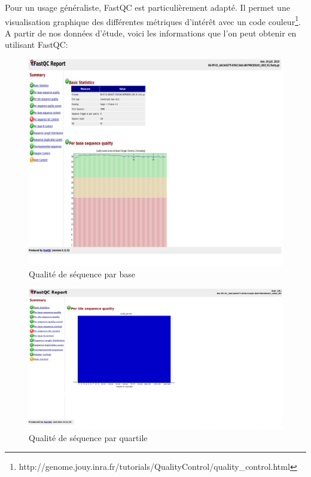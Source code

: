 \documentclass[a4paper,11pt]{article}
\begin{document}
Pour un usage généraliste, FastQC est particulièrement adapté. Il
permet une visualisation graphique des différentes métriques d'intérêt
avec un code
couleur\footnote{{http://genome.jouy.inra.fr/tutorials/QualityControl/quality_control.html}}. A
partir de nos données d'étude, voici les informations que l'on peut
obtenir en utilisant FastQC:


\begin{figure}
  \begin{center}
    \includegraphics[width=16cm]{Images/FastqcMetrics1_Sample1_R1}
  \end{center}
  \caption{Qualité de séquence par base}
  \label{fig-FastqcMetrics1_Sample1_R1}
\end{figure}

\begin{figure}
  \begin{center}
    \includegraphics[width=16cm]{Images/FastqcMetrics2_Sample1_R1}
  \end{center}
  \caption{Qualité de séquence par quartile}
  \label{fig-FastqcMetrics2_Sample1_R1}
\end{figure}
\end{document}
